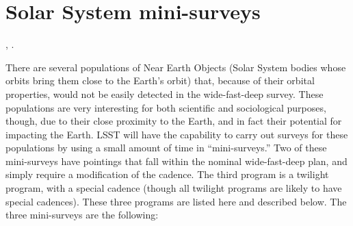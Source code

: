 %
%
%
%
%
%

\section{Solar System mini-surveys}
\def\secname{solar_system_specials}\label{sec:\secname}

,
.



There are several populations of Near Earth Objects (Solar System bodies
whose orbits bring them close to the Earth's orbit) that, because of
their orbital properties, would not be easily detected in the
wide-fast-deep survey. These populations are very interesting for both
scientific and sociological purposes, though, due to their close
proximity to the Earth, and in fact their potential for impacting the
Earth. LSST will have the capability to carry out surveys for these
populations by using a small amount of time in ``mini-surveys.'' Two of
these mini-surveys have pointings that fall within the nominal
wide-fast-deep plan, and simply require a modification of the cadence.
The third program is a twilight program, with a special cadence (though
all twilight programs are likely to  have special cadences). These three
programs are listed here and described below. The three mini-surveys are
the following:

